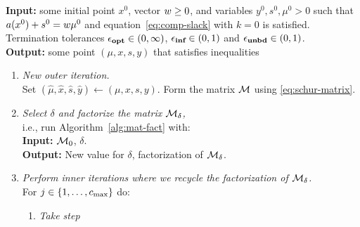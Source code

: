 \documentclass{article}
\begin{document}

\begin{algorithm}[H]
\textbf{Input:} some initial point $x^{0}$, vector $w \ge 0$, and variables $y^{0}, s^{0}, \mu^0 > 0$  such that $a(x^{0}) + s^{0} = w \mu^{0}$ and equation~\eqref{eq:comp-slack} with $k=0$ is satisfied. Termination tolerances $\epsilon_{\textbf{opt}} \in (0,\infty)$, $\epsilon_{\textbf{inf}} \in (0,1)$ and $\epsilon_{\textbf{unbd}} \in (0,1)$. \\
\textbf{Output:} some point $(\mu, x, s, y)$ that satisfies inequalities \termination{}
\vspace{0.1 cm} %
\begin{enumerate}[label*=A.{\arabic*}]
\item \label{line:form-K}  \emph{New outer iteration.} \\
Set $(\hat{\mu}, \hat{x}, \hat{s}, \hat{y}) \gets (\mu, x, s, y)$. Form the matrix $\mathcal{M}$ using \eqref{eq:schur-matrix}.
\item \emph{Select $\delta$ and factorize the matrix $\mathcal{M}_{\delta}$,} \\
i.e., run Algorithm~\ref{alg:mat-fact} with: \\
\hspace*{0.1cm}  \textbf{Input:} $\mathcal{M}_{0}$, $\delta$. \\
\hspace*{0.1cm} \textbf{Output:} New value for $\delta$, factorization of $\mathcal{M}_{\delta}$.
\item \label{take-steps}  \emph{Perform inner iterations where we recycle the factorization of $\mathcal{M}_{\delta}$.} \\
For $j \in \{ 1, \dots , c_{\max} \}$ do:
\begin{enumerate}[label*=.{\arabic*}]
\item \emph{Take step}\label{line:take-step}
\begin{enumerate}[label=-Case {\Roman*}]

\end{enumerate}
\end{enumerate}
\end{enumerate}
\end{algorithm}
\end{document}
